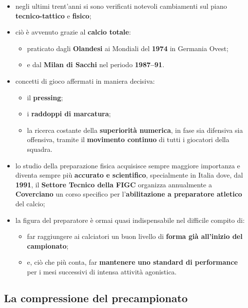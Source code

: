\begin{itemize}
  \item negli ultimi trent'anni si sono verificati notevoli cambiamenti sul piano
    \textbf{tecnico-tattico} e \textbf{fisico};
  \item ciò è avvenuto grazie al \textbf{calcio totale}:
    \begin{itemize}
      \item praticato dagli \textbf{Olandesi} ai Mondiali del \textbf{1974} in Germania Ovest;
      \item e dal \textbf{Milan di Sacchi} nel periodo \textbf{1987--91}.
    \end{itemize}
  \item concetti di gioco affermati in maniera decisiva:
    \begin{itemize}
      \item il \textbf{pressing};
      \item i \textbf{raddoppi di marcatura};
      \item la ricerca costante della \textbf{superiorità numerica}, in fase sia difensiva sia
        offensiva, tramite il \textbf{movimento continuo} di tutti i giocatori della squadra.
    \end{itemize}
  \item lo studio della preparazione fisica acquisisce sempre maggiore importanza e diventa sempre
    più \textbf{accurato e scientifico}, specialmente in Italia dove, dal \textbf{1991}, il
    \textbf{Settore Tecnico della FIGC} organizza annualmente a \textbf{Coverciano} un corso
    specifico per l'\textbf{abilitazione a preparatore atletico} del calcio;
  \item la figura del preparatore è ormai quasi indispensabile nel difficile compito di:
    \begin{itemize}
      \item far raggiungere ai calciatori un buon livello di \textbf{forma già all'inizio del
        campionato};
      \item e, ciò che più conta, far \textbf{mantenere uno standard di performance} per i mesi
        successivi di intensa attività agonistica.
    \end{itemize}
\end{itemize}

\subsection{La compressione del precampionato}

